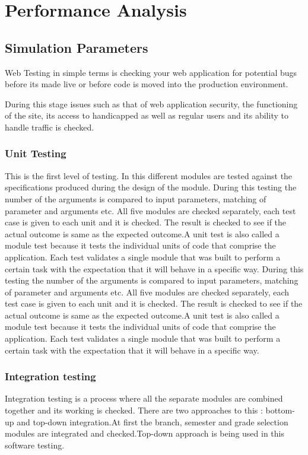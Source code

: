 \documentclass[BTech]{srmuthesis}
\begin{document}
\section{Performance Analysis}

\subsection{Simulation Parameters}
Web Testing in simple terms is checking your web application for potential bugs before its made live or before code is moved into the production environment.

During this stage issues such as that of web application security, the functioning of the site, its access to handicapped as well as regular users and its ability to handle traffic is checked.
\subsubsection{Unit Testing}
This is the first level of testing. In this different modules are tested against the specifications produced during the design of the module. During this testing the number of the arguments is compared to input parameters, matching of parameter and arguments etc. All five modules are checked separately, each test case is given to each unit and it is checked. The result is checked to see if the actual outcome is same as the expected outcome.A unit test is also called a module test because it tests the individual units of code that comprise the application. Each test validates a single module that was built to perform a certain task with the expectation that it will behave in a specific way. During this testing the number of the arguments is compared to input parameters, matching of parameter and arguments etc. All five modules are checked separately, each test case is given to each unit and it is checked. The result is checked to see if the actual outcome is same as the expected outcome.A unit test is also called a module test because it tests the individual units of code that comprise the application. Each test validates a single module that was built to perform a certain task with the expectation that it will behave in a specific way.
\subsubsection{Integration testing}
Integration testing is a process where all the separate modules are combined together
and its working is checked. There are two approaches to this : bottom-up and top-down
integration.At first the branch, semester and grade selection modules are integrated and checked.Top-down approach is being used in this software testing.
\end{document}
